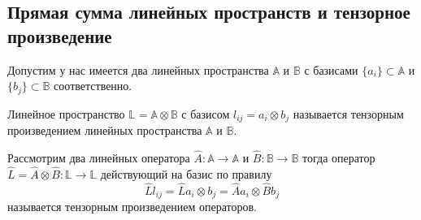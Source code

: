 \subsection{Прямая сумма линейных пространств и тензорное произведение}

Допустим у нас имеется два линейных пространства $\mathbb{A}$ и 
$\mathbb{B}$ с базисами $\{a_i\} \subset \mathbb{A}$ и
$\{b_j\} \subset \mathbb{B}$ соответственно. 

\begin{definition}
Линейное пространство $\mathbb{L} = \mathbb{A} \otimes \mathbb{B}$ с
базисом $l_{ij} = a_i \otimes b_j$ называется тензорным произведением
линейных пространства $\mathbb{A}$ и $\mathbb{B}$. 
\end{definition}

\begin{definition}
\label{def:tensorprod}
Рассмотрим два линейных оператора $\hat{A}: \mathbb{A} \to \mathbb{A}$
и $\hat{B} : \mathbb{B} \to \mathbb{B}$ тогда оператор 
$\hat{L} = \hat{A} \otimes \hat{B} : \mathbb{L} \to \mathbb{L}$
действующий на базис по правилу
\[
\hat{L} l_{ij} = 
\hat{L} a_i \otimes b_j = 
\hat{A} a_i \otimes \hat{B} b_j
\]
называется тензорным произведением операторов.
\end{definition}
